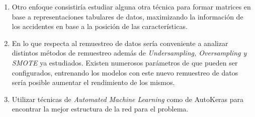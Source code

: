 \begin{enumerate}
		\item Otro enfoque consistiría estudiar alguna otra técnica para formar matrices en base a representaciones tabulares de datos, maximizando la información de los accidentes en base a la posición de las características.

		\item En lo que respecta al remuestreo de datos sería conveniente a analizar distintos métodos de remuestreo además de \textit{Undersampling, Oversampling y SMOTE} ya estudiados. Existen numerosos parámetros de  que pueden ser configurados, entrenando los modelos con este nuevo remuestreo de datos sería posible aumentar el rendimiento de los mismos.

		\item Utilizar técnicas de \textit{Automated Machine Learning} como  de AutoKeras \cite{AutoKeras} para encontrar la mejor estructura de la red para el problema.

	\end{enumerate}
